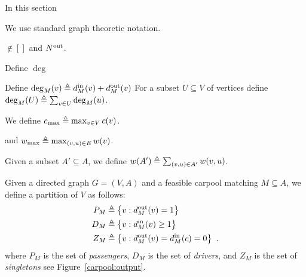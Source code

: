 
In this section

We use standard graph theoretic notation.

$\nin[]$ and $\nout[]$.



Define $\deg$

Define $\deg_M(v) \eqdf \din[M](v) + \dout[M](v)$
%
For a subset $U \subseteq V$ of vertices define
$\deg_M(U) \eqdf \sum_{v \in U} \deg_M(u)$.


We define $c_{\max} \eqdf \max_{v \in V} c(v)$.

and $w_{\max} \eqdf \max_{(v,u) \in E} w(v)$.

Given a subset $A' \subseteq A$, we define
$w(A') \eqdf \sum_{(v,u) \in A'} w(v,u)$.


Given a directed graph $G = (V,A)$ and a feasible carpool matching
$M \subseteq A$, we define a partition of $V$ as follows:
\begin{align*}
P_M & \eqdf \set{v : \dout[M](v) = 1} \\
D_M & \eqdf \set{v : \din[M](v) \geq 1} \\
Z_M & \eqdf \set{v : \dout[M](v) = \din[M](c) = 0}
~.
\end{align*}
where $P_M$ is the set of \emph{passengers}, $D_M$ is the set of
\emph{drivers}, and $Z_M$ is the set of \emph{singletons}
see Figure~\ref{carpool:output}.

